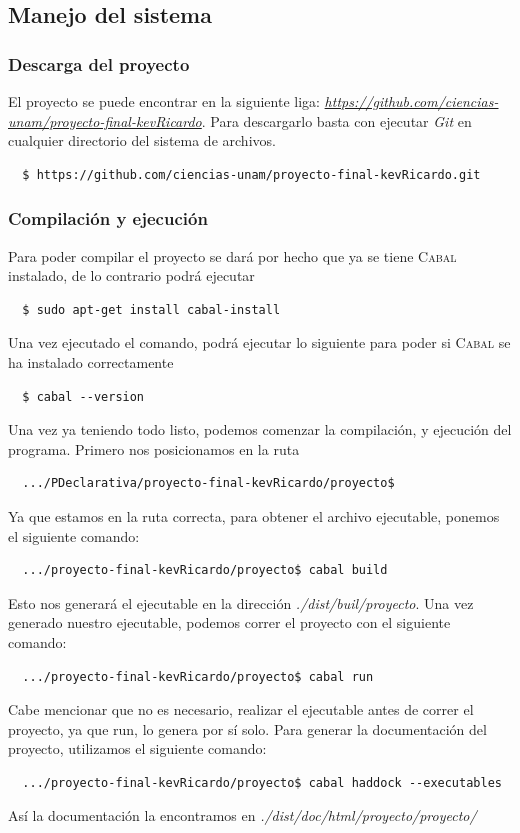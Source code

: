 \documentclass[a4paper, titlepage, 12pt]{article}
\theoremstyle{definition}%
\theoremstyle{Teorema}
\theoremstyle{break}
\begin{document}
\subsection{Manejo del sistema}
\subsubsection*{Descarga del proyecto}
El proyecto se puede encontrar en la siguiente liga: \textit{\href{https://github.com/ciencias-unam/proyecto-final-kevRicardo}{https://github.com/ciencias-unam/proyecto-final-kevRicardo}}. 
Para descargarlo basta con ejecutar \textit{Git} en cualquier directorio del sistema de archivos.\\
\small
\begin{lstlisting}
  $ https://github.com/ciencias-unam/proyecto-final-kevRicardo.git
\end{lstlisting}
\subsubsection*{Compilación y ejecución}
Para poder compilar el proyecto se dará por hecho que ya se tiene \textsc{Cabal} instalado, de lo contrario podrá ejecutar 
\begin{lstlisting}
  $ sudo apt-get install cabal-install
\end{lstlisting}
Una vez ejecutado el comando, podrá ejecutar lo siguiente para poder si \textsc{Cabal} se ha instalado correctamente
\begin{lstlisting}
  $ cabal --version
\end{lstlisting}

Una vez ya teniendo todo listo, podemos comenzar la compilación, y ejecución del programa. Primero nos posicionamos en la ruta
\begin{lstlisting}
  .../PDeclarativa/proyecto-final-kevRicardo/proyecto$
\end{lstlisting}
Ya que estamos en la ruta correcta, para obtener el archivo ejecutable, ponemos el siguiente comando:
\begin{lstlisting}
  .../proyecto-final-kevRicardo/proyecto$ cabal build
\end{lstlisting}
Esto nos generará el ejecutable en la dirección \textit{./dist/buil/proyecto}.
Una vez generado nuestro ejecutable, podemos correr el proyecto con el siguiente comando:
\begin{lstlisting}
  .../proyecto-final-kevRicardo/proyecto$ cabal run
\end{lstlisting}
Cabe mencionar que no es necesario, realizar el ejecutable antes de correr el proyecto, ya que run, lo genera por sí solo.
Para generar la documentación del proyecto, utilizamos el siguiente comando:
\begin{lstlisting}
  .../proyecto-final-kevRicardo/proyecto$ cabal haddock --executables
\end{lstlisting}
Así la documentación la encontramos en \textit{./dist/doc/html/proyecto/proyecto/}\\
\end{document}
